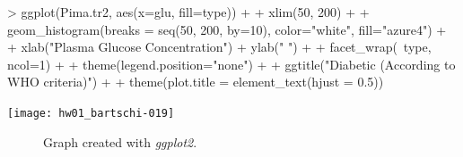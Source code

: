\documentclass[12pt,letterpaper,final]{article}
\begin{document}
\begin{enumerate}
\begin{enumerate}
\begin{Schunk}
\begin{Sinput}
> ggplot(Pima.tr2, aes(x=glu, fill=type)) +
+   xlim(50, 200) +
+   geom_histogram(breaks = seq(50, 200, by=10), color="white", fill="azure4") +
+   xlab("Plasma Glucose Concentration") + ylab(" ") +
+   facet_wrap(~type, ncol=1) +
+   theme(legend.position="none") +
+   ggtitle("Diabetic (According to WHO criteria)") +
+   theme(plot.title = element_text(hjust = 0.5))
\end{Sinput}
\end{Schunk}
\texttt{[image: hw01\_bartschi-019]}


\begin{figure}[ht]
\caption{\label{hw01_q2b}
Graph created with {\it ggplot2}.
}
\end{figure}


\end{enumerate}

\end{enumerate}


\newpage


~\\
\end{document}

